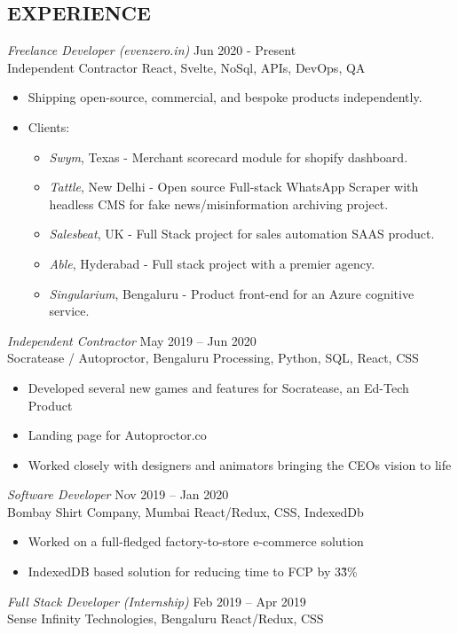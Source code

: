 \documentclass[margin, 10pt]{res} %
\begin{document}
\begin{resume}
\section{EXPERIENCE}
{\sl Freelance Developer (evenzero.in)} \hfill Jun 2020 - Present \\
 Independent Contractor \hfill React, Svelte, NoSql, APIs, DevOps, QA
\begin{itemize}
\item Shipping open-source, commercial, and bespoke products independently.
\item Clients:
\begin{itemize}
\item {\sl Swym}, Texas - Merchant scorecard module for shopify dashboard.
\item {\sl Tattle}, New Delhi - Open source Full-stack WhatsApp Scraper with headless CMS for fake news/misinformation archiving project. 
\item {\sl Salesbeat}, UK - Full Stack project for sales automation SAAS product.
\item {\sl Able}, Hyderabad - Full stack project with a premier agency.
\item {\sl Singularium}, Bengaluru - Product front-end for an Azure cognitive service.
\end{itemize}
\end{itemize}
{\sl Independent Contractor} \hfill May 2019 – Jun 2020 \\
Socratease / Autoproctor, Bengaluru \hfill Processing, Python, SQL, React, CSS
\begin{itemize}
\item Developed several new games and features for Socratease, an Ed-Tech Product
\item Landing page for Autoproctor.co
\item Worked closely with designers and animators bringing the CEOs vision to life 
\end{itemize}
{\sl Software Developer} \hfill Nov 2019 – Jan 2020 \\
Bombay Shirt Company, Mumbai \hfill React/Redux, CSS, IndexedDb
\begin{itemize}
\item Worked on a full-fledged factory-to-store e-commerce solution
\item IndexedDB based solution for reducing time to FCP by 3\~3\%
\end{itemize}
{\sl Full Stack Developer (Internship)} \hfill Feb 2019 – Apr 2019 \\
Sense Infinity Technologies, Bengaluru \hfill React/Redux, CSS


\end{resume}
\end{document}
